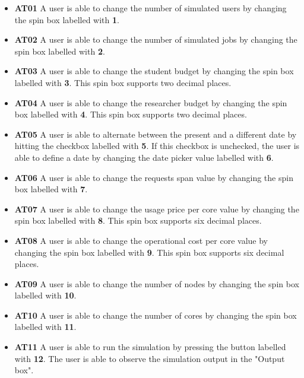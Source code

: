 \documentclass[12pt]{article}
\begin{document}
\begin{itemize}  
\item \textbf{AT01} A user is able to change the number of simulated users by changing the spin box labelled with \textbf{1}.

\item \textbf{AT02} A user is able to change the number of simulated jobs by changing the spin box labelled with \textbf{2}.

\item \textbf{AT03} A user is able to change the student budget by changing the spin box labelled with \textbf{3}. This spin box supports two decimal places.

\item \textbf{AT04} A user is able to change the researcher budget by changing the spin box labelled with \textbf{4}. This spin box supports two decimal places.
 
\item \textbf{AT05} A user is able to alternate between the present and a different date by hitting the checkbox labelled with \textbf{5}. If this checkbox is unchecked, the user is able to define a date by changing the date picker value labelled with \textbf{6}.

\item \textbf{AT06} A user is able to change the requests span value by changing the spin box labelled with \textbf{7}.

\item \textbf{AT07} A user is able to change the usage price per core value by changing the spin box labelled with \textbf{8}. This spin box supports six decimal places.

\item \textbf{AT08} A user is able to change the operational cost per core value by changing the spin box labelled with \textbf{9}. This spin box supports six decimal places.

\item \textbf{AT09} A user is able to change the number of nodes by changing the spin box labelled with \textbf{10}.

\item \textbf{AT10} A user is able to change the number of cores by changing the spin box labelled with \textbf{11}.

\item \textbf{AT11} A user is able to run the simulation by pressing the button labelled with \textbf{12}. The user is able to observe the simulation output in the "Output box".

\end{itemize}
\end{document}
